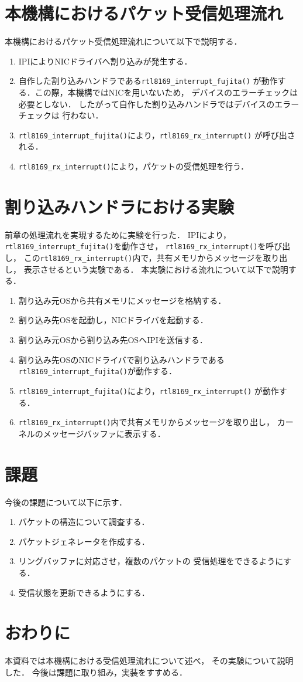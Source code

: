\documentclass[12pt]{jsarticle}
\begin{document}
\section{本機構におけるパケット受信処理流れ}
本機構におけるパケット受信処理流れについて以下で説明する．
\begin{enumerate}
    \item IPIによりNICドライバへ割り込みが発生する．
    \item 自作した割り込みハンドラである{\tt rtl8169\_interrupt\_fujita()}
        が動作する．この際，本機構ではNICを用いないため，
        デバイスのエラーチェックは必要としない．
        したがって自作した割り込みハンドラではデバイスのエラーチェックは
        行わない．
    \item {\tt rtl8169\_interrupt\_fujita()}により，{\tt rtl8169\_rx\_interrupt()}
        が呼び出される．
    \item {\tt rtl8169\_rx\_interrupt()}により，パケットの受信処理を行う．
\end{enumerate}
\section{割り込みハンドラにおける実験}
前章の処理流れを実現するために実験を行った．
IPIにより，{\tt rtl8169\_interrupt\_fujita()}を動作させ，
{\tt rtl8169\_rx\_interrupt()}を呼び出し，
この{\tt rtl8169\_rx\_interrupt()}内で，共有メモリからメッセージを取り出し，
表示させるという実験である．
本実験における流れについて以下で説明する．
\begin{enumerate}
    \item 割り込み元OSから共有メモリにメッセージを格納する．
    \item 割り込み先OSを起動し，NICドライバを起動する．
    \item 割り込み元OSから割り込み先OSへIPIを送信する．
    \item 割り込み先OSのNICドライバで割り込みハンドラである
        {\tt rtl8169\_interrupt\_fujita()}が動作する．
    \item {\tt rtl8169\_interrupt\_fujita()}により，{\tt rtl8169\_rx\_interrupt()}
        が動作する．
    \item {\tt rtl8169\_rx\_interrupt()}内で共有メモリからメッセージを取り出し，
        カーネルのメッセージバッファに表示する．
\end{enumerate}

\section{課題}
今後の課題について以下に示す．
\begin{enumerate}
    \item パケットの構造について調査する．
    \item パケットジェネレータを作成する．
    \item リングバッファに対応させ，複数のパケットの
        受信処理をできるようにする．
    \item 受信状態を更新できるようにする．
\end{enumerate}
\section{おわりに}
本資料では本機構における受信処理流れについて述べ，
その実験について説明した．
今後は課題に取り組み，実装をすすめる．
\end{document}
